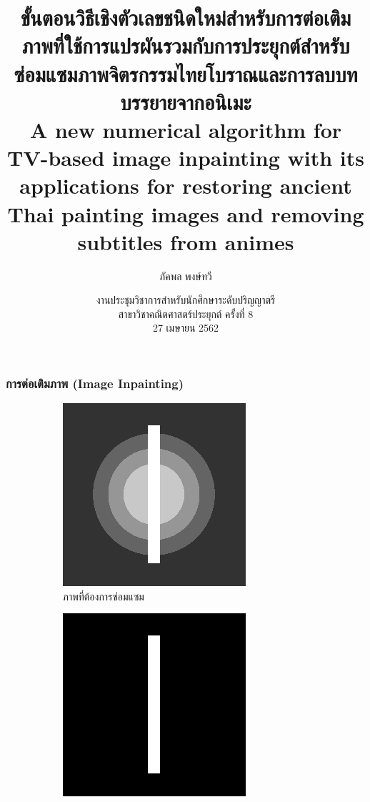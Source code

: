\documentclass[xcolor=dvipsnames, xetex,serif]{beamer}
\title[วิธีเชิงตัวเลขสำหรับต่อเติมภาพ]{\normalsize{ขั้นตอนวิธีเชิงตัวเลขชนิดใหม่สำหรับการต่อเติมภาพที่ใช้การแปรผันรวมกับการประยุกต์สำหรับซ่อมแซมภาพจิตรกรรมไทยโบราณและการลบบทบรรยายจากอนิเมะ\\A new numerical algorithm for TV-based image inpainting with its applications for restoring ancient Thai painting images and removing subtitles from animes}}
\author[ภัคพล]{ภัคพล พงษ์ทวี}
\institute[SU]{
 	ภาควิชาคณิตศาสตร์\\
 	มหาวิทยาลัยศิลปากร \\}
\date[Project Proposal]{งานประชุมวิชาการสำหรับนักศึกษาระดับปริญญาตรี\\ สาขาวิชาคณิตศาสตร์ประยุกต์ ครั้งที่ 8\\27 เมษายน 2562}
\numberwithin{equation}{section}
\begin{document}
    \begin{frame}
        \titlepage 
    \end{frame}
    \begin{frame}
        \frametitle{การต่อเติมภาพ (Image Inpainting)} 
        \begin{figure}[H]
            \centering
            \begin{subfigure}{0.3\linewidth}
                \centering
                \includegraphics[width=0.8\linewidth]{images/grayscale_inpaint/toinpaint.png}
                \caption{ภาพที่ต้องการซ่อมแซม}
            \end{subfigure}
            \begin{subfigure}{0.3\linewidth}
                \centering
                \includegraphics[width=0.8\linewidth]{images/grayscale_inpaint/inpaintdomain.png}

\end{subfigure}
\end{figure}
\end{frame}
\end{document}
